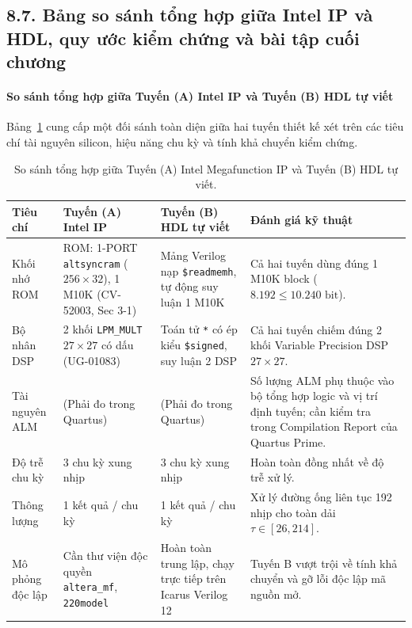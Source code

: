 \subsection*{8.7. Bảng so sánh tổng hợp giữa Intel IP và HDL, quy ước kiểm chứng và bài tập cuối chương}

\paragraph{So sánh tổng hợp giữa Tuyến (A) Intel IP và Tuyến (B) HDL tự viết}
Bảng~\ref{tab:ch08_ip_vs_hdl} cung cấp một đối sánh toàn diện giữa hai tuyến thiết kế xét trên các tiêu chí tài nguyên silicon, hiệu năng chu kỳ và tính khả chuyển kiểm chứng.

\begin{table}[htbp]
\centering
\small
\caption{So sánh tổng hợp giữa Tuyến (A) Intel Megafunction IP và Tuyến (B) HDL tự viết.}
\label{tab:ch08_ip_vs_hdl}
\begin{tabularx}{\textwidth}{l p{4.2cm} p{4.2cm} X}
\toprule
\textbf{Tiêu chí} & \textbf{Tuyến (A) Intel IP} & \textbf{Tuyến (B) HDL tự viết} & \textbf{Đánh giá kỹ thuật} \\
\midrule
Khối nhớ ROM & ROM: 1-PORT \texttt{altsyncram} ($256 \times 32$), 1 M10K (CV-52003, Sec 3-1) & Mảng Verilog nạp \texttt{\$readmemh}, tự động suy luận 1 M10K & Cả hai tuyến dùng đúng 1 M10K block ($8.192 \le 10.240\text{ bit}$). \\
\addlinespace[3pt]
Bộ nhân DSP & 2 khối \texttt{LPM\_MULT} $27 \times 27$ có dấu (UG-01083) & Toán tử \texttt{*} có ép kiểu \texttt{\$signed}, suy luận 2 DSP & Cả hai tuyến chiếm đúng 2 khối Variable Precision DSP $27 \times 27$. \\
\addlinespace[3pt]
Tài nguyên ALM & (Phải đo trong Quartus) & (Phải đo trong Quartus) & Số lượng ALM phụ thuộc vào bộ tổng hợp logic và vị trí định tuyến; cần kiểm tra trong Compilation Report của Quartus Prime. \\
\addlinespace[3pt]
Độ trễ chu kỳ & 3 chu kỳ xung nhịp & 3 chu kỳ xung nhịp & Hoàn toàn đồng nhất về độ trễ xử lý. \\
\addlinespace[3pt]
Thông lượng & 1 kết quả / chu kỳ & 1 kết quả / chu kỳ & Xử lý đường ống liên tục 192 nhịp cho toàn dải $\tau \in [26, 214]$. \\
\addlinespace[3pt]
Mô phỏng độc lập & Cần thư viện độc quyền \texttt{altera\_mf}, \texttt{220model} & Hoàn toàn trung lập, chạy trực tiếp trên Icarus Verilog 12 & Tuyến B vượt trội về tính khả chuyển và gỡ lỗi độc lập mã nguồn mở. \\
\bottomrule
\end{tabularx}
\end{table}

